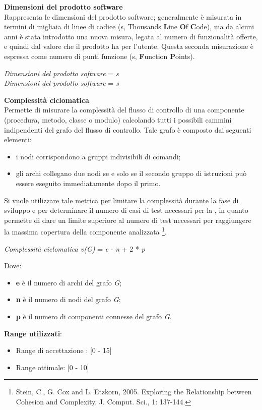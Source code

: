 \textbf{Dimensioni del prodotto software}\\

Rappresenta le dimensioni del prodotto software; generalmente \`e misurata in termini di migliaia di linee di codice (s, Thousands \textbf{L}ine \textbf{O}f \textbf{C}ode), ma da alcuni anni è stata introdotto una nuova misura, legata al numero di funzionalità offerte, e quindi dal valore che il prodotto ha per l'utente. Questa seconda misurazione è espressa come numero di punti funzione (s, \textbf{F}unction \textbf{P}oints). \\
\begin{center}
	\textit{Dimensioni del prodotto software} = \textit{s} \\
	\textit{Dimensioni del prodotto software} = \textit{s} 
\end{center}

\textbf{Complessità ciclomatica}\\

Permette di misurare la complessità del flusso di controllo di una componente (procedura, metodo, classe o modulo) calcolando tutti i possibili cammini indipendenti del grafo del flusso di controllo. Tale grafo è composto dai seguenti elementi:
\begin{itemize}
	\item i nodi corrispondono a gruppi indivisibili di comandi;
	\item gli archi collegano due nodi se e solo se il secondo gruppo di istruzioni può essere eseguito immediatamente dopo il primo.
\end{itemize}
Si vuole utilizzare tale metrica per limitare la complessità durante la fase di sviluppo e per determinare il numero di casi di test necessari per la , in quanto permette di dare un limite superiore al numero di test necessari per raggiungere la massima copertura della componente analizzata \footnote{Stein, C., G. Cox and L. Etzkorn, 2005. Exploring the Relationship between Cohesion and Complexity. J. Comput. Sci., 1: 137-144.}.
\begin{center}
	\textit{Complessità ciclomatica v(G)} = \textit{e} - \textit{n} + 2 * \textit{p}
\end{center}
Dove:
\begin{itemize}
	\item \textbf{e} è il numero di archi del grafo \textit{G};
	\item \textbf{n} è il numero di nodi del grafo \textit{G};
	\item \textbf{p} è il numero di componenti connesse del grafo \textit{G}.
\end{itemize}
\textbf{Range utilizzati}:
\begin{itemize}
	\item Range di accettazione : [0 - 15]
	\item Range ottimale: [0 - 10]
\end{itemize}

